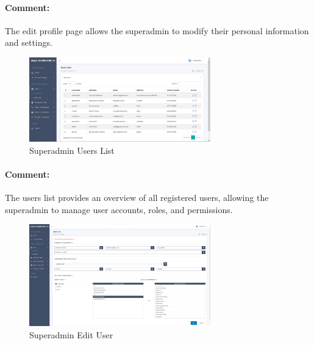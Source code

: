\begin{itemize}
\paragraph{Comment:} The edit profile page allows the superadmin to modify their personal information and settings.
\newpage
\begin{figure}[htbp]
  \centering
  \includegraphics[width=0.7\textwidth]{SCREENSHOTS/superadmin/users_list.png}
  \caption{Superadmin Users List}
  \label{fig:users-list}
\end{figure}
\paragraph{Comment:} The users list provides an overview of all registered users, allowing the superadmin to manage user accounts, roles, and permissions.

\begin{figure}[htbp]
    \centering
    \includegraphics[width=0.7\textwidth]{SCREENSHOTS/superadmin/edit_user.png}
    \caption{Superadmin Edit User}
    \label{fig:edit-user}
  \end{figure}

\end{itemize}
